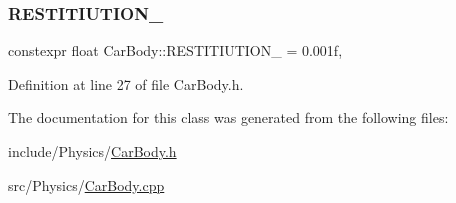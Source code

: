\mbox{\label{classCarBody_a726ff99793ed9dfc0f96e3690c3035f8}} 
\subsubsection{\texorpdfstring{R\+E\+S\+T\+I\+T\+I\+U\+T\+I\+O\+N\+\_\+}{RESTITIUTION\_}}
{\footnotesize\ttfamily constexpr float Car\+Body\+::\+R\+E\+S\+T\+I\+T\+I\+U\+T\+I\+O\+N\+\_\+ = 0.\+001f\hspace{0.3cm}{\ttfamily [static]}, {\ttfamily [private]}}



Definition at line 27 of file Car\+Body.\+h.



The documentation for this class was generated from the following files\+:\begin{DoxyCompactItemize}
\item 
include/\+Physics/\hyperlink{CarBody_8h}{Car\+Body.\+h}\item 
src/\+Physics/\hyperlink{CarBody_8cpp}{Car\+Body.\+cpp}\end{DoxyCompactItemize}
